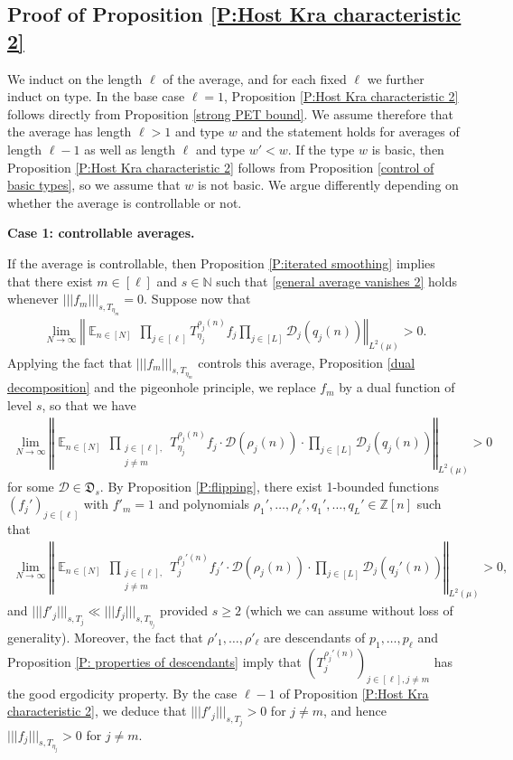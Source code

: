 \documentclass[11pt]{amsart}
\theoremstyle{definition}
\newcommand{\N}{{\mathbb N}}
\newcommand{\Z}{{\mathbb Z}}
\newcommand{\CD}{{\mathcal D}}
\newcommand{\FD}{{\mathfrak D}}
\newcommand{\norm}[1]{\left\Vert #1\right\Vert}
\newcommand{\nnorm}[1]{\lvert\!|\!| #1|\!|\!\rvert}
\DeclareMathOperator*{\E}{\mathbb{E}}
\newcommand{\brac}[1]{\mathopen{}\left( #1 \mathclose{}\right)}
\begin{document}
\subsection{Proof of Proposition \ref{P:Host Kra characteristic 2}}
We induct on the length $\ell$ of the average, and for each fixed $\ell$ we further induct on type.
In the base case $\ell=1$, Proposition \ref{P:Host Kra characteristic 2} follows directly from Proposition \ref{strong PET bound}. We assume therefore that the average has length $\ell>1$ and type $w$ and the statement holds for averages of length $\ell-1$ as well as length $\ell$ and type $w'<w$. If the type $w$ is basic, then Proposition \ref{P:Host Kra characteristic 2} follows from Proposition \ref{control of basic types}, so we assume that $w$ is not basic. We argue differently depending on whether the average is controllable or not.

\smallskip
\textbf{Case 1: controllable averages.}
\smallskip

If the average is controllable, then Proposition \ref{P:iterated smoothing} implies that there exist $m\in[\ell]$ and $s\in\N$ such that \eqref{general average vanishes 2} holds whenever $\nnorm{f_m}_{s, T_{\eta_m}}=0$. Suppose now that
\begin{align*}%
	\lim_{N\to\infty}\norm{\E_{n\in [N]} \,\prod_{j\in[\ell]}T_{{\eta_j}}^{\rho_j(n)}f_j \prod_{j\in[L]}\CD_{j}(q_j(n))}_{L^2(\mu)} > 0.
\end{align*}
Applying the fact that $\nnorm{f_m}_{s, T_{\eta_m}}$ controls this average, Proposition \ref{dual decomposition} and the pigeonhole principle, we replace  $f_m$ by a dual function of level $s$, so that we have
\begin{align*}%
	\lim_{N\to\infty}\norm{\E_{n\in [N]} \,\prod_{\substack{j\in[\ell],\\ j\neq m}}T_{{\eta_j}}^{\rho_j(n)}f_j \cdot \CD(\rho_j(n)) \cdot\prod_{j\in[L]}\CD_{j}(q_j(n))}_{L^2(\mu)} > 0
\end{align*}
for some $\CD\in\FD_s$. By Proposition \ref{P:flipping}, there exist 1-bounded functions $(f_j')_{j\in[\ell]}$ with $f'_m = 1$ and polynomials $\rho_1', \ldots, \rho_{\ell}', q_1', \ldots, q_L'\in\Z[n]$ such that
\begin{align*}
	\lim_{N\to\infty}\norm{\E_{n\in [N]} \,\prod_{\substack{j\in[\ell],\\ j\neq m}}T_j^{\rho_j'(n)}f_j' \cdot \CD(\rho_j(n)) \cdot\prod_{j\in[L]}\CD_{j}(q_j'(n))}_{L^2(\mu)} > 0,
\end{align*}
 and $\nnorm{f'_j}_{s, T_j} \ll \nnorm{f_j}_{s, T_{\eta_j}}$ provided $s\geq 2$ (which we can assume without loss of generality). Moreover, the fact that $\rho'_1, \ldots, \rho'_\ell$ are descendants of $p_1, \ldots, p_\ell$ and Proposition \ref{P: properties of descendants} imply that $\brac{T_j^{\rho_j'(n)}}_{j\in[\ell], j\neq m}$ has the good ergodicity property. By the case $\ell-1$ of Proposition \ref{P:Host Kra characteristic 2}, we deduce that $\nnorm{f'_j}_{s, T_j}>0$ for $j\neq m$, and hence $\nnorm{f_j}_{s, T_{\eta_j}}>0$ for $j\neq m$.
\end{document}
